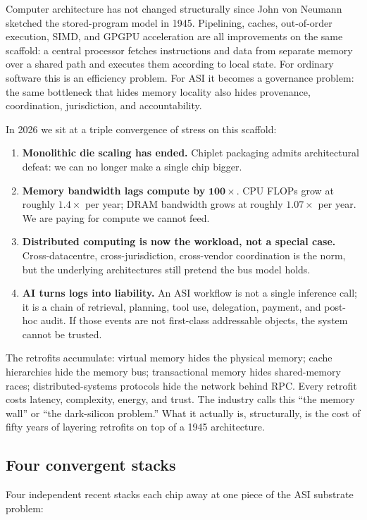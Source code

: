 \documentclass[11pt,letterpaper]{article}
\theoremstyle{remark}
\begin{document}
Computer architecture has not changed structurally since John von Neumann sketched the
stored-program model in 1945. Pipelining, caches, out-of-order execution, SIMD, and GPGPU
acceleration are all improvements on the same scaffold: a central processor fetches
instructions and data from separate memory over a shared path and executes them according
to local state. For ordinary software this is an efficiency problem. For ASI it becomes a
governance problem: the same bottleneck that hides memory locality also hides provenance,
coordination, jurisdiction, and accountability.

In 2026 we sit at a triple convergence of stress on this scaffold:
\begin{enumerate}[leftmargin=2em,nosep]
\item \textbf{Monolithic die scaling has ended.} Chiplet packaging admits architectural
defeat: we can no longer make a single chip bigger.
\item \textbf{Memory bandwidth lags compute by} $\mathbf{100\times}$. CPU FLOPs grow at
roughly $1.4\times$ per year; DRAM bandwidth grows at roughly $1.07\times$ per year. We
are paying for compute we cannot feed.
\item \textbf{Distributed computing is now the workload, not a special case.}
Cross-datacentre, cross-jurisdiction, cross-vendor coordination is the norm, but the
underlying architectures still pretend the bus model holds.
\item \textbf{AI turns logs into liability.} An ASI workflow is not a single inference call;
it is a chain of retrieval, planning, tool use, delegation, payment, and post-hoc audit.
If those events are not first-class addressable objects, the system cannot be trusted.
\end{enumerate}
The retrofits accumulate: virtual memory hides the physical memory; cache hierarchies hide
the memory bus; transactional memory hides shared-memory races; distributed-systems
protocols hide the network behind RPC. Every retrofit costs latency, complexity, energy,
and trust. The industry calls this ``the memory wall'' or ``the dark-silicon problem.''
What it actually is, structurally, is the cost of fifty years of layering retrofits on
top of a 1945 architecture.

\subsection{Four convergent stacks}

Four independent recent stacks each chip away at one piece of the ASI substrate problem:
\end{document}

